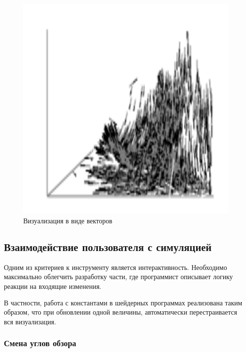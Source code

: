 \begin{figure}
\begin{center}
  \includegraphics[scale=1]{Figures/vectors}
\end{center}
\caption{Визуализация в виде векторов}
\label{fig:ss_vectors}
\end{figure}



\subsection{Взаимодействие пользователя с симуляцией}

Одним из критериев к инструменту является интерактивность.
Необходимо максимально облегчить разработку части, где программист описывает логику 
реакции на входящие изменения.

В частности, работа с константами в шейдерных программах реализована
таким образом, что при обновлении одной величины, автоматически перестраивается
вся визуализация.

\subsubsection{Смена углов обзора}

